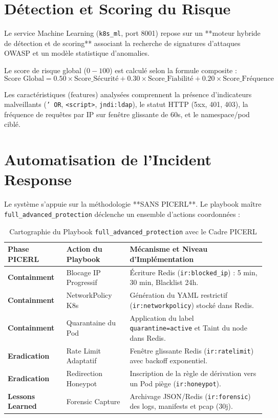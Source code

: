 \documentclass[12pt,a4paper]{report}
\begin{document}
\chapter{Détection et Scoring du Risque}
Le service Machine Learning (\texttt{k8s\_ml}, port 8001) repose sur un **moteur hybride de détection et de scoring** associant la recherche de signatures d'attaques OWASP et un modèle statistique d'anomalies.

Le score de risque global ($0 - 100$) est calculé selon la formule composite :
\begin{equation}
\text{Score Global} = 0.50 \times \text{Score\_Sécurité} + 0.30 \times \text{Score\_Fiabilité} + 0.20 \times \text{Score\_Fréquence}
\end{equation}

Les caractéristiques (features) analysées comprennent la présence d'indicateurs malveillants (\texttt{' OR}, \texttt{<script>}, \texttt{jndi:ldap}), le statut HTTP (5xx, 401, 403), la fréquence de requêtes par IP sur fenêtre glissante de 60s, et le namespace/pod ciblé.

\chapter{Automatisation de l'Incident Response}
Le système s'appuie sur la méthodologie **SANS PICERL**. Le playbook maître \texttt{full\_advanced\_protection} déclenche un ensemble d'actions coordonnées :

\begin{table}[H]
\centering
\caption{Cartographie du Playbook \texttt{full\_advanced\_protection} avec le Cadre PICERL}
\label{tab:picerl}
\begin{tabularx}{\textwidth}{llX}
\toprule
\textbf{Phase PICERL} & \textbf{Action du Playbook} & \textbf{Mécanisme et Niveau d'Implémentation} \\
\midrule
\textbf{Containment} & Blocage IP Progressif & Écriture Redis (\texttt{ir:blocked\_ip}) : 5 min, 30 min, Blacklist 24h. \\
\textbf{Containment} & NetworkPolicy K8s & Génération du YAML restrictif (\texttt{ir:networkpolicy}) stocké dans Redis. \\
\textbf{Containment} & Quarantaine du Pod & Application du label \texttt{quarantine=active} et Taint du node dans Redis. \\
\textbf{Eradication} & Rate Limit Adaptatif & Fenêtre glissante Redis (\texttt{ir:ratelimit}) avec backoff exponentiel. \\
\textbf{Eradication} & Redirection Honeypot & Inscription de la règle de dérivation vers un Pod piège (\texttt{ir:honeypot}). \\
\textbf{Lessons Learned} & Forensic Capture & Archivage JSON/Redis (\texttt{ir:forensic}) des logs, manifests et pcap (30j). \\
\bottomrule
\end{tabularx}
\end{table}
\end{document}

